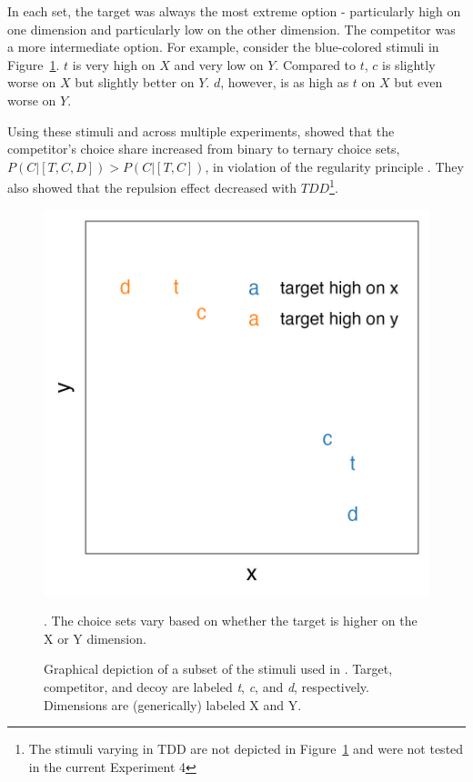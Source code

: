 In each set, the target was always the most extreme option - particularly high on one dimension and particularly low on the other dimension. The competitor was a more intermediate option. For example, consider the blue-colored stimuli in Figure~\ref{fig:banerjee_stim}. $t$ is very high on $X$ and very low on $Y$. Compared to $t$, $c$ is slightly worse on $X$ but slightly better on $Y$. $d$, however, is as high as $t$ on $X$ but even worse on $Y$. 

Using these stimuli and across multiple experiments, \textcite{banerjeeFactorsThatPromote2024} showed that the competitor's choice share increased from binary to ternary choice sets, $P(C|[T,C,D])>P(C|[T,C])$, in violation of the regularity principle \parencite{marley1989random}. They also showed that the repulsion effect decreased with $TDD$\footnote{The stimuli varying in TDD are not depicted in Figure~\ref{fig:banerjee_stim} and were not tested in the current Experiment 4}.

\begin{figure}
    \includegraphics{figures/banerjee_stim.jpeg}
    \caption{Graphical depiction of a subset of the stimuli used in \textcite{banerjeeFactorsThatPromote2024}. Target, competitor, and decoy are labeled \textit{t}, \textit{c}, and \textit{d}, respectively. Dimensions are (generically) labeled X and Y.}. The choice sets vary based on whether the target is higher on the X or Y dimension.
    \label{fig:banerjee_stim}
\end{figure}

